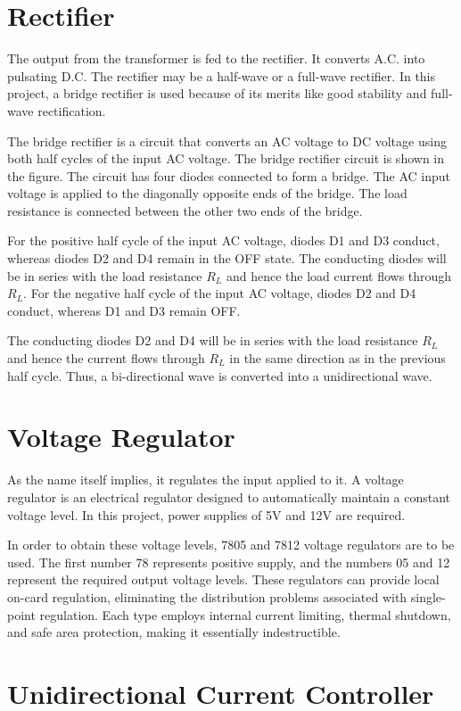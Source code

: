 \documentclass[12pt]{article}
\begin{document}
\newpage 
\section*{Rectifier}
The output from the transformer is fed to the rectifier. It converts A.C. into pulsating D.C. The rectifier may be a half-wave or a full-wave rectifier. In this project, a bridge rectifier is used because of its merits like good stability and full-wave rectification. 

The bridge rectifier is a circuit that converts an AC voltage to DC voltage using both half cycles of the input AC voltage. The bridge rectifier circuit is shown in the figure. The circuit has four diodes connected to form a bridge. The AC input voltage is applied to the diagonally opposite ends of the bridge. The load resistance is connected between the other two ends of the bridge.

For the positive half cycle of the input AC voltage, diodes D1 and D3 conduct, whereas diodes D2 and D4 remain in the OFF state. The conducting diodes will be in series with the load resistance $R_L$ and hence the load current flows through $R_L$. For the negative half cycle of the input AC voltage, diodes D2 and D4 conduct, whereas D1 and D3 remain OFF.

The conducting diodes D2 and D4 will be in series with the load resistance $R_L$ and hence the current flows through $R_L$ in the same direction as in the previous half cycle. Thus, a bi-directional wave is converted into a unidirectional wave.

\section*{Voltage Regulator}
As the name itself implies, it regulates the input applied to it. A voltage regulator is an electrical regulator designed to automatically maintain a constant voltage level. In this project, power supplies of 5V and 12V are required. 

In order to obtain these voltage levels, 7805 and 7812 voltage regulators are to be used. The first number 78 represents positive supply, and the numbers 05 and 12 represent the required output voltage levels. These regulators can provide local on-card regulation, eliminating the distribution problems associated with single-point regulation. Each type employs internal current limiting, thermal shutdown, and safe area protection, making it essentially indestructible.
\newpage
\section*{Unidirectional Current Controller}
\end{document}
